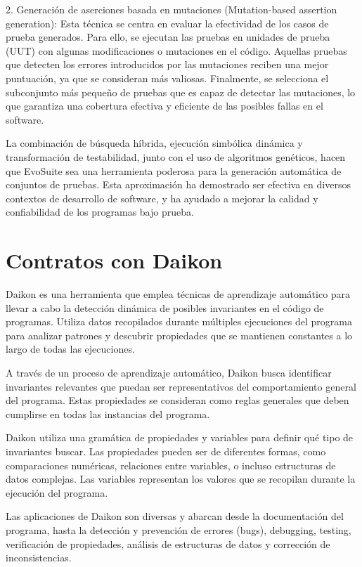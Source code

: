 2. Generación de aserciones basada en mutaciones (Mutation-based assertion generation):
Esta técnica se centra en evaluar la efectividad de los casos de prueba generados. Para ello, se ejecutan las pruebas en unidades de prueba (UUT) con algunas modificaciones o mutaciones en el código. Aquellas pruebas que detecten los errores introducidos por las mutaciones reciben una mejor puntuación, ya que se consideran más valiosas. Finalmente, se selecciona el subconjunto más pequeño de pruebas que es capaz de detectar las mutaciones, lo que garantiza una cobertura efectiva y eficiente de las posibles fallas en el software.

La combinación de búsqueda híbrida, ejecución simbólica dinámica y transformación de testabilidad, junto con el uso de algoritmos genéticos, hacen que EvoSuite sea una herramienta poderosa para la generación automática de conjuntos de pruebas. Esta aproximación ha demostrado ser efectiva en diversos contextos de desarrollo de software, y ha ayudado a mejorar la calidad y confiabilidad de los programas bajo prueba.


\section{Contratos con Daikon}

Daikon es una herramienta que emplea técnicas de aprendizaje automático para llevar a cabo la detección dinámica de posibles invariantes en el código de programas. Utiliza datos recopilados durante múltiples ejecuciones del programa para analizar patrones y descubrir propiedades que se mantienen constantes a lo largo de todas las ejecuciones.

A través de un proceso de aprendizaje automático, Daikon busca identificar invariantes relevantes que puedan ser representativos del comportamiento general del programa. Estas propiedades se consideran como reglas generales que deben cumplirse en todas las instancias del programa.

Daikon utiliza una gramática de propiedades y variables para definir qué tipo de invariantes buscar. Las propiedades pueden ser de diferentes formas, como comparaciones numéricas, relaciones entre variables, o incluso estructuras de datos complejas. Las variables representan los valores que se recopilan durante la ejecución del programa.

Las aplicaciones de Daikon son diversas y abarcan desde la documentación del programa, hasta la detección y prevención de errores (bugs), debugging, testing, verificación de propiedades, análisis de estructuras de datos y corrección de inconsistencias.


